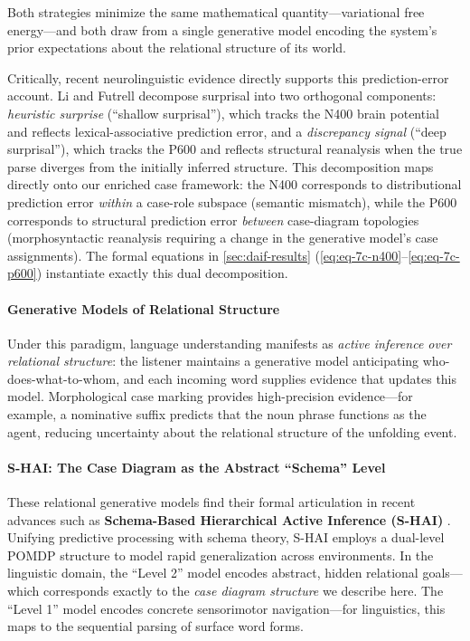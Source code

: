 \documentclass[
]{article}
\begin{document}
Both strategies minimize the same mathematical quantity---variational
free energy---and both draw from a single generative model encoding the
system's prior expectations about the relational structure of its world.

Critically, recent neurolinguistic evidence directly supports this
prediction-error account. Li and Futrell
\citetext{\citeyear{li2023decomposition}; \citeyear{li2024shallow}}
decompose surprisal into two orthogonal components: \emph{heuristic
surprise} (``shallow surprisal''), which tracks the N400 brain potential
and reflects lexical-associative prediction error, and a
\emph{discrepancy signal} (``deep surprisal''), which tracks the P600
and reflects structural reanalysis when the true parse diverges from the
initially inferred structure. This decomposition maps directly onto our
enriched case framework: the N400 corresponds to distributional
prediction error \emph{within} a case-role subspace (semantic mismatch),
while the P600 corresponds to structural prediction error \emph{between}
case-diagram topologies (morphosyntactic reanalysis requiring a change
in the generative model's case assignments). The formal equations in
\autoref{sec:daif-results}
(\autoref{eq:eq-7c-n400}--\autoref{eq:eq-7c-p600}) instantiate exactly
this dual decomposition.

\paragraph{Generative Models of Relational
Structure}\label{generative-models-of-relational-structure}

Under this paradigm, language understanding manifests as \emph{active
inference over relational structure}: the listener maintains a
generative model anticipating who-does-what-to-whom, and each incoming
word supplies evidence that updates this model. Morphological case
marking provides high-precision evidence---for example, a nominative
suffix predicts that the noun phrase functions as the agent, reducing
uncertainty about the relational structure of the unfolding event.

\paragraph{S-HAI: The Case Diagram as the Abstract ``Schema''
Level}\label{s-hai-the-case-diagram-as-the-abstract-schema-level}

These relational generative models find their formal articulation in
recent advances such as \textbf{Schema-Based Hierarchical Active
Inference (S-HAI)} \citep{maele2026schema}. Unifying predictive
processing with schema theory, S-HAI employs a dual-level POMDP
structure to model rapid generalization across environments. In the
linguistic domain, the ``Level 2'' model encodes abstract, hidden
relational goals---which corresponds exactly to the \emph{case diagram
structure} we describe here. The ``Level 1'' model encodes concrete
sensorimotor navigation---for linguistics, this maps to the sequential
parsing of surface word forms.
\end{document}
